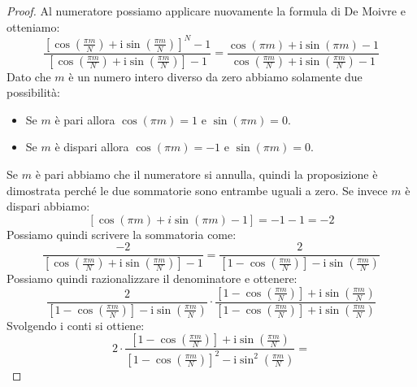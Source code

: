 \begin{proposizione}
\begin{proof}
        Al numeratore possiamo applicare nuovamente la formula di De Moivre e otteniamo:
        \begin{equation*}
            \frac{\left[\cos\left(\frac{\pi m}{N}\right) + \text{i} \sin\left(
                    \frac{\pi m}{N}\right)\right]^N - 1}{\left[\cos\left(\frac{\pi m}{N}\right)
                    + \text{i} \sin\left(\frac{\pi m}{N}\right)\right] - 1} =
            \frac{\cos\left(\pi m\right) + \text{i} \sin\left(\pi m\right) - 1}{\cos\left(\frac{\pi m}{N}\right)
                + \text{i} \sin\left(\frac{\pi m}{N}\right) - 1}
        \end{equation*}
        Dato che $m$ è un numero intero diverso da zero abbiamo solamente due possibilità:
        \begin{itemize}
            \item Se $m$ è pari allora $\cos(\pi m) = 1$ e $\sin(\pi m) = 0$.
            \item Se $m$ è dispari allora $\cos(\pi m) = -1$ e $\sin(\pi m) = 0$.
        \end{itemize}
        Se $m$ è pari abbiamo che il numeratore si annulla, quindi la proposizione
        è dimostrata perché le due sommatorie sono entrambe uguali a zero. Se
        invece $m$ è dispari abbiamo:
        \begin{equation*}
            \left[ \cos(\pi m) + i \sin(\pi m) - 1\right] = -1 - 1 = -2
        \end{equation*}
        Possiamo quindi scrivere la sommatoria come:
        \begin{equation*}
            \frac{-2}{\left[\cos\left(\frac{\pi m}{N}\right) + \text{i} \sin\left(\frac{\pi m}{N}\right)\right] - 1} =
            \frac{2}{\left[1 - \cos\left(\frac{\pi m}{N}\right)\right] - \text{i} \sin\left(\frac{\pi m}{N}\right)}
        \end{equation*}
        Possiamo quindi razionalizzare il denominatore e ottenere:
        \begin{equation*}
            \frac{2}{\left[1 - \cos\left(\frac{\pi m}{N}\right)\right] - \text{i} \sin\left(\frac{\pi m}{N}\right)}
            \cdot \frac{\left[1 - \cos\left(\frac{\pi m}{N}\right)\right] + \text{i} \sin\left(\frac{\pi m}{N}\right)}{\left[1 - \cos\left(\frac{\pi m}{N}\right)\right] + \text{i} \sin\left(\frac{\pi m}{N}\right)}
        \end{equation*}
        Svolgendo i conti si ottiene:
        \begin{equation*}
            2 \cdot \frac{\left[1 - \cos\left(\frac{\pi m}{N}\right)\right] + \text{i} \sin\left(\frac{\pi m}{N}\right)}{\left[1 - \cos\left(\frac{\pi m}{N}\right)\right]^2 - \text{i} \sin^2\left(\frac{\pi m}{N}\right)} =

\end{equation*}
\end{proof}
\end{proposizione}
